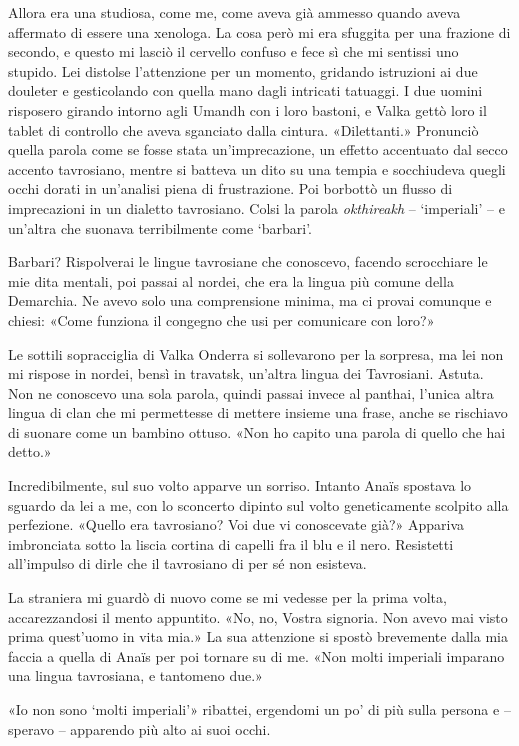 Allora era una studiosa, come me, come aveva già ammesso quando aveva
affermato di essere una xenologa. La cosa però mi era sfuggita per una
frazione di secondo, e questo mi lasciò il cervello confuso e fece sì
che mi sentissi uno stupido. Lei distolse l'attenzione per un momento,
gridando istruzioni ai due douleter e gesticolando con quella mano dagli
intricati tatuaggi. I due uomini risposero girando intorno agli Umandh
con i loro bastoni, e Valka gettò loro il tablet di controllo che aveva
sganciato dalla cintura. «Dilettanti.» Pronunciò quella parola come se
fosse stata un'imprecazione, un effetto accentuato dal secco accento
tavrosiano, mentre si batteva un dito su una tempia e socchiudeva quegli
occhi dorati in un'analisi piena di frustrazione. Poi borbottò un flusso
di imprecazioni in un dialetto tavrosiano. Colsi la parola
\emph{okthireakh} -- `imperiali' -- e un'altra che suonava terribilmente
come `barbari'.

Barbari? Rispolverai le lingue tavrosiane che conoscevo, facendo
scrocchiare le mie dita mentali, poi passai al nordei, che era la lingua
più comune della Demarchia. Ne avevo solo una comprensione minima, ma ci
provai comunque e chiesi: «Come funziona il congegno che usi per
comunicare con loro?»

Le sottili sopracciglia di Valka Onderra si sollevarono per la sorpresa,
ma lei non mi rispose in nordei, bensì in travatsk, un'altra lingua dei
Tavrosiani. Astuta. Non ne conoscevo una sola parola, quindi passai
invece al panthai, l'unica altra lingua di clan che mi permettesse di
mettere insieme una frase, anche se rischiavo di suonare come un bambino
ottuso. «Non ho capito una parola di quello che hai detto.»

Incredibilmente, sul suo volto apparve un sorriso. Intanto Anaïs
spostava lo sguardo da lei a me, con lo sconcerto dipinto sul volto
geneticamente scolpito alla perfezione. «Quello era tavrosiano? Voi due
vi conoscevate già?» Appariva imbronciata sotto la liscia cortina di
capelli fra il blu e il nero. Resistetti all'impulso di dirle che il
tavrosiano di per sé non esisteva.

La straniera mi guardò di nuovo come se mi vedesse per la prima volta,
accarezzandosi il mento appuntito. «No, no, Vostra signoria. Non avevo
mai visto prima quest'uomo in vita mia.» La sua attenzione si spostò
brevemente dalla mia faccia a quella di Anaïs per poi tornare su di me.
«Non molti imperiali imparano una lingua tavrosiana, e tantomeno due.»

«Io non sono `molti imperiali'» ribattei, ergendomi un po' di più sulla
persona e -- speravo -- apparendo più alto ai suoi occhi.

